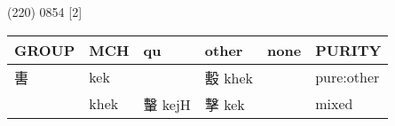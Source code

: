 \documentclass[14pt,a4paper]{scrartcl}
\begin{document}
(220) 0854 {[}2{]}

\begin{longtable}[c]{@{}llllll@{}}
\toprule
\begin{minipage}[b]{0.14\columnwidth}\raggedright\strut
GROUP
\strut\end{minipage} &
\begin{minipage}[b]{0.14\columnwidth}\raggedright\strut
MCH
\strut\end{minipage} &
\begin{minipage}[b]{0.14\columnwidth}\raggedright\strut
qu
\strut\end{minipage} &
\begin{minipage}[b]{0.14\columnwidth}\raggedright\strut
other
\strut\end{minipage} &
\begin{minipage}[b]{0.14\columnwidth}\raggedright\strut
none
\strut\end{minipage} &
\begin{minipage}[b]{0.14\columnwidth}\raggedright\strut
PURITY
\strut\end{minipage}\tabularnewline
\midrule
\endhead
\begin{minipage}[t]{0.14\columnwidth}\raggedright\strut
軎
\strut\end{minipage} &
\begin{minipage}[t]{0.14\columnwidth}\raggedright\strut
kek
\strut\end{minipage} &
\begin{minipage}[t]{0.14\columnwidth}\raggedright\strut
\strut\end{minipage} &
\begin{minipage}[t]{0.14\columnwidth}\raggedright\strut
毄 khek
\strut\end{minipage} &
\begin{minipage}[t]{0.14\columnwidth}\raggedright\strut
\strut\end{minipage} &
\begin{minipage}[t]{0.14\columnwidth}\raggedright\strut
pure:other
\strut\end{minipage}\tabularnewline
\begin{minipage}[t]{0.14\columnwidth}\raggedright\strut
𣪠
\strut\end{minipage} &
\begin{minipage}[t]{0.14\columnwidth}\raggedright\strut
khek
\strut\end{minipage} &
\begin{minipage}[t]{0.14\columnwidth}\raggedright\strut
轚 kejH
\strut\end{minipage} &
\begin{minipage}[t]{0.14\columnwidth}\raggedright\strut
擊 kek
\strut\end{minipage} &
\begin{minipage}[t]{0.14\columnwidth}\raggedright\strut
\strut\end{minipage} &
\begin{minipage}[t]{0.14\columnwidth}\raggedright\strut
mixed
\strut\end{minipage}\tabularnewline
\bottomrule
\end{longtable}
\end{document}
